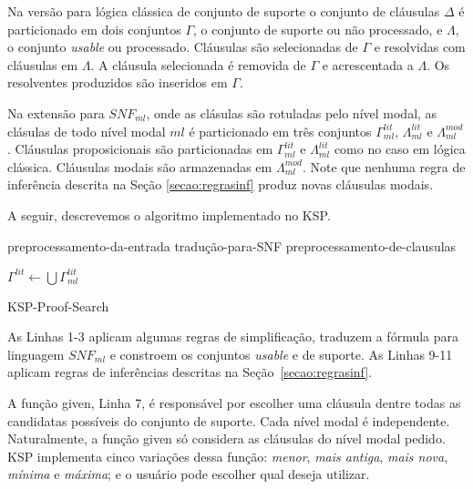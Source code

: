 Na versão para lógica clássica de conjunto de suporte o conjunto de cláusulas $\Delta$ é particionado em dois conjuntos $\Gamma$, o conjunto de suporte ou não processado, e $\Lambda$, o conjunto \textit{usable} ou processado. Cláusulas são selecionadas de $\Gamma$ e resolvidas com cláusulas em $\Lambda$. A cláusula selecionada é removida de $\Gamma$ e acrescentada a $\Lambda$. Os resolventes produzidos são inseridos em $\Gamma$.

Na extensão para $SNF_{ml}$, onde as clásulas são rotuladas pelo nível modal, as clásulas de todo nível modal $ml$ é particionado em três conjuntos $\Gamma^{lit}_{ml}$, $\Lambda^{lit}_{ml}$ e $\Lambda^{mod}_{ml}$. Cláusulas proposicionais são particionadas em $\Gamma^{lit}_{ml}$ e $\Lambda^{lit}_{ml}$ como no caso em lógica clássica. Cláusulas modais são armazenadas em $\Lambda^{mod}_{ml}$. Note que nenhuma regra de inferência descrita na Seção \ref{secao:regrasinf} produz novas cláusulas modais.

A seguir, descrevemos o algoritmo implementado no KSP.

\begin{algorithm}[H]
	\SetAlgoLined
	preprocessamento-da-entrada\;
	tradução-para-SNF\;
	preprocessamento-de-clausulas\;

	$\Gamma^{lit} \leftarrow \bigcup \Gamma^{lit}_{ml}$\;
	\caption{KSP-Proof-Search}
\end{algorithm}

As Linhas 1-3 aplicam algumas regras de simplificação, traduzem a fórmula para linguagem $SNF_{ml}$ e constroem os conjuntos \textit{usable} e de suporte. As Linhas 9-11 aplicam regras de inferências descritas na Seção~\ref{secao:regrasinf}.

A função {\sf given}, Linha 7, é responsável por escolher uma cláusula dentre todas as candidatas possíveis do conjunto de suporte. Cada nível modal é independente. Naturalmente, a função {\sf given} só considera as cláusulas do nível modal pedido. KSP implementa cinco variações dessa função: \textit{menor}, \textit{mais antiga}, \textit{mais nova}, \textit{mínima} e \textit{máxima}; e o usuário pode escolher qual deseja utilizar.

